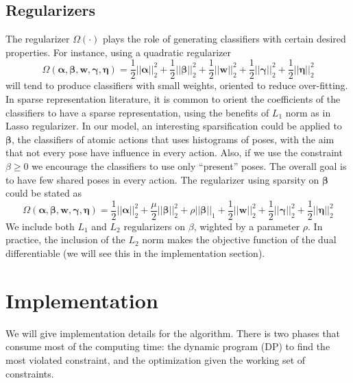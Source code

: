 \documentclass[10pt,letterpaper]{article}
\newcommand{\+}[1]{\ensuremath{{\boldsymbol #1}}}
\begin{document}
\subsection{Regularizers}
The regularizer $\Omega(\cdot)$ plays the role of generating classifiers with certain desired properties. For instance, using a quadratic regularizer
\begin{equation}
\Omega(\+\alpha,\+\beta,\+w,\+\gamma,\+\eta ) = \frac{1}{2}||\+\alpha||_2^2 + \frac{1}{2}||\+\beta||_2^2 + \frac{1}{2}||\+w||_2^2 + \frac{1}{2}||\+\gamma||_2^2 + \frac{1}{2}||\+\eta||_2^2
\end{equation}
will tend to produce classifiers with small weights, oriented to reduce over-fitting. In sparse representation literature, it is common to orient the coefficients of the classifiers to have a sparse representation, using the benefits of $L_1$ norm as in Lasso regularizer. In our model, an interesting sparsification could be applied to $\+\beta$, the classifiers of atomic actions that uses histograms of poses, with the aim that not every pose have influence in every action. Also, if we use the constraint $\beta \ge 0$ we encourage the classifiers to use only ``present'' poses. The overall goal is to have few shared poses in every action. The regularizer using sparsity on $\+\beta$ could be stated as
\begin{equation}
\Omega(\+\alpha,\+\beta,\+w,\+\gamma,\+\eta ) = \frac{1}{2}||\+\alpha||_2^2 + \frac{\mu}{2}||\+\beta||_2^2 + \rho ||\+\beta||_1  + \frac{1}{2}||\+w||_2^2 + \frac{1}{2}||\+\gamma||_2^2 + \frac{1}{2}||\+\eta||_2^2
\end{equation}
We include both $L_1$ and $L_2$ regularizers on $\beta$, wighted by a parameter $\rho$. In practice, the inclusion of the $L_2$ norm makes the objective function of the dual  differentiable (we will see this in the implementation section). 


\section{Implementation}
We will give implementation details for the algorithm. There is two phases that consume most of the computing time:  the dynamic program (DP) to find the most violated constraint, and the optimization given the working set of constraints.
\end{document}
